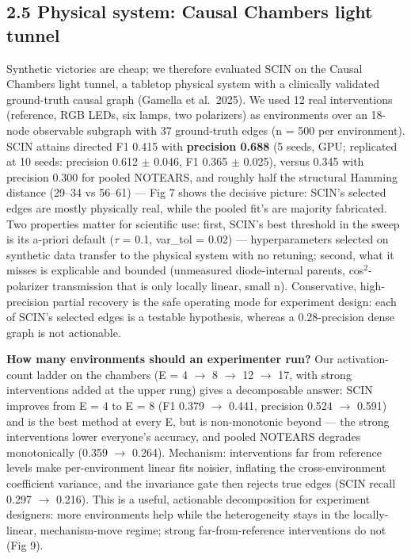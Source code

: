 \documentclass[11pt]{article}
\begin{document}
\subsection{2.5 Physical system: Causal Chambers light tunnel}\label{results-2.5-physical-system-causal-chambers-light-tunnel-exp-g}

Synthetic victories are cheap; we therefore evaluated SCIN on the
Causal Chambers light tunnel, a tabletop physical system with a
clinically validated ground-truth causal graph (Gamella et al.~2025).
We used 12 real interventions (reference, RGB LEDs, six lamps, two
polarizers) as environments over an 18-node observable subgraph with
37 ground-truth edges (n = 500 per environment). SCIN attains directed
F1 0.415 with \textbf{precision 0.688} (5 seeds, GPU; replicated at 10
seeds: precision 0.612 \(\pm\) 0.046, F1 0.365 \(\pm\) 0.025), versus 0.345 with
precision 0.300 for pooled NOTEARS, and roughly half the structural
Hamming distance (29--34 vs 56--61) --- Fig 7 shows the decisive picture:
SCIN's selected edges are mostly physically real, while the pooled
fit's are majority fabricated. Two properties matter for scientific
use: first, SCIN's best threshold in the sweep is its a-priori default
(\(\tau\) = 0.1, var\_tol = 0.02) --- hyperparameters selected on synthetic
data transfer to the physical system with no retuning; second, what
it misses is explicable and bounded (unmeasured diode-internal
parents, cos\(^2\)-polarizer transmission that is only locally linear,
small n). Conservative, high-precision partial recovery is the safe
operating mode for experiment design: each of SCIN's selected edges is
a testable hypothesis, whereas a 0.28-precision dense graph is not
actionable.

\textbf{How many environments should an experimenter run?} Our
activation-count ladder on the chambers (E = 4 \(\rightarrow\) 8 \(\rightarrow\) 12 \(\rightarrow\) 17, with
strong interventions added at the upper rung) gives a decomposable
answer: SCIN improves from E = 4 to E = 8 (F1 0.379 \(\rightarrow\) 0.441,
precision 0.524 \(\rightarrow\) 0.591) and is the best method at every E, but is
non-monotonic beyond --- the strong interventions lower everyone's
accuracy, and pooled NOTEARS degrades monotonically (0.359 \(\rightarrow\) 0.264).
Mechanism: interventions far from reference levels make
per-environment linear fits noisier, inflating the cross-environment
coefficient variance, and the invariance gate then rejects true edges
(SCIN recall 0.297 \(\rightarrow\) 0.216). This is a useful, actionable
decomposition for experiment designers: more environments help while
the heterogeneity stays in the locally-linear, mechanism-move regime;
strong far-from-reference interventions do not (Fig 9).
\end{document}
